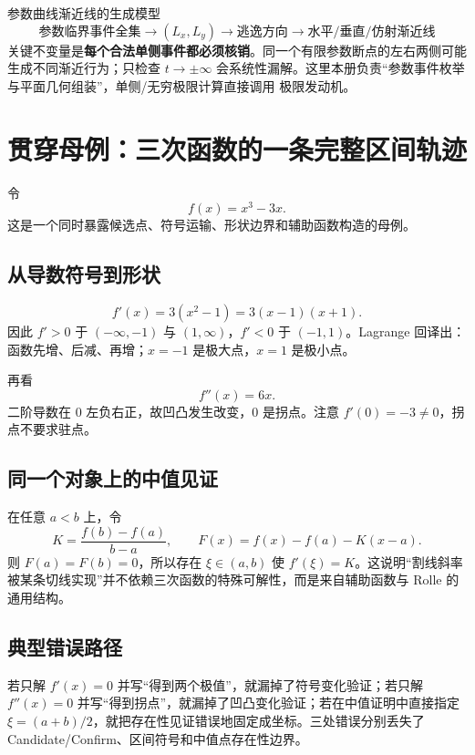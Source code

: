 \documentclass[UTF8,fontset=none,11pt,a4paper]{ctexart}
\begin{document}
\begin{corebox}{参数曲线渐近线的生成模型}
\[
\boxed{\text{参数临界事件全集}\to(L_x,L_y)\to\text{逃逸方向}\to\text{水平/垂直/仿射渐近线}}
\]
关键不变量是\textbf{每个合法单侧事件都必须核销}。同一个有限参数断点的左右两侧可能生成不同渐近行为；只检查 $t\to\pm\infty$ 会系统性漏解。这里本册负责“参数事件枚举与平面几何组装”，单侧/无穷极限计算直接调用  极限发动机。
\end{corebox}

\section{贯穿母例：三次函数的一条完整区间轨迹}

令
\[
f(x)=x^3-3x.
\]
这是一个同时暴露候选点、符号运输、形状边界和辅助函数构造的母例。

\subsection{从导数符号到形状}

\[
f'(x)=3(x^2-1)=3(x-1)(x+1).
\]
因此 $f'>0$ 于 $(-\infty,-1)$ 与 $(1,\infty)$，$f'<0$ 于 $(-1,1)$。Lagrange 回译出：函数先增、后减、再增；$x=-1$ 是极大点，$x=1$ 是极小点。

再看
\[
f''(x)=6x.
\]
二阶导数在 $0$ 左负右正，故凹凸发生改变，$0$ 是拐点。注意 $f'(0)=-3\ne0$，拐点不要求驻点。

\subsection{同一个对象上的中值见证}

在任意 $a<b$ 上，令
\[
K=\frac{f(b)-f(a)}{b-a},
\qquad F(x)=f(x)-f(a)-K(x-a).
\]
则 $F(a)=F(b)=0$，所以存在 $\xi\in(a,b)$ 使 $f'(\xi)=K$。这说明“割线斜率被某条切线实现”并不依赖三次函数的特殊可解性，而是来自辅助函数与 Rolle 的通用结构。

\subsection{典型错误路径}

若只解 $f'(x)=0$ 并写“得到两个极值”，就漏掉了符号变化验证；若只解 $f''(x)=0$ 并写“得到拐点”，就漏掉了凹凸变化验证；若在中值证明中直接指定 $\xi=(a+b)/2$，就把存在性见证错误地固定成坐标。三处错误分别丢失了 Candidate/Confirm、区间符号和中值点存在性边界。
\end{document}
